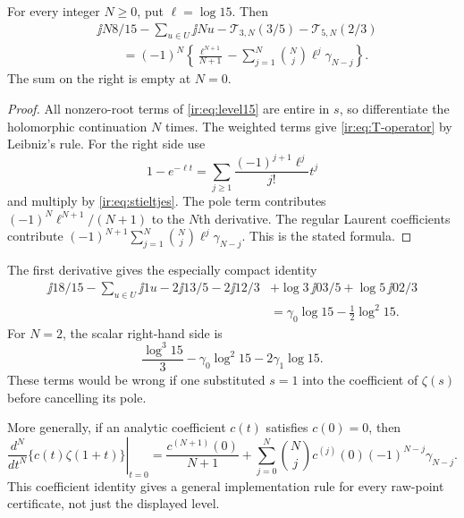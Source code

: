 \begin{theorem}
\label{ir:thm:jets15}
For every integer $N\ge0$, put $\ell=\log15$. Then
\begin{align}
 &\jj{N}{8/15}-\sum_{u\in U}\jj{N}{u}
 -\mathcal T_{3,N}(3/5)-\mathcal T_{5,N}(2/3)\nonumber\\
 &\qquad =(-1)^N\left\{\frac{\ell^{N+1}}{N+1}
 -\sum_{j=1}^{N}\binom Nj\ell^j\gamma_{N-j}\right\}.
 \label{ir:eq:jets15}
\end{align}
The sum on the right is empty at $N=0$.
\end{theorem}
\begin{proof}
All nonzero-root terms of \eqref{ir:eq:level15} are entire in $s$,
so differentiate the holomorphic continuation $N$ times. The weighted
terms give \eqref{ir:eq:T-operator} by Leibniz's rule. For the right
side use
\[
 1-e^{-\ell t}=\sum_{j\ge1}\frac{(-1)^{j+1}\ell^j}{j!}t^j
\]
and multiply by \eqref{ir:eq:stieltjes}. The pole term contributes
$(-1)^N\ell^{N+1}/(N+1)$ to the $N$th derivative. The regular
Laurent coefficients contribute
$(-1)^{N+1}\sum_{j=1}^N\binom Nj\ell^j\gamma_{N-j}$.
This is the stated formula.
\end{proof}

The first derivative gives the especially compact identity
\begin{align}
 \jj{1}{8/15}-\sum_{u\in U}\jj{1}{u}
 -2\jj{1}{3/5}-2\jj{1}{2/3}
 &+\log3\,\jj{0}{3/5}+\log5\,\jj{0}{2/3}\nonumber\\
 &=\gamma_0\log15-\tfrac12\log^2 15.
 \label{ir:eq:first-jet}
\end{align}
For $N=2$, the scalar right-hand side is
\[
 \frac{\log^3 15}{3}-\gamma_0\log^2 15-2\gamma_1\log15.
\]
These terms would be wrong if one substituted $s=1$ into the
coefficient of $\zeta(s)$ before cancelling its pole.

More generally, if an analytic coefficient $c(t)$ satisfies $c(0)=0$,
then
\begin{equation}\label{ir:eq:general-pole-jet}
 \left.\frac{d^N}{dt^N}\{c(t)\zeta(1+t)\}\right|_{t=0}
 =\frac{c^{(N+1)}(0)}{N+1}
 +\sum_{j=0}^{N}\binom Nj c^{(j)}(0)(-1)^{N-j}\gamma_{N-j}.
\end{equation}
This coefficient identity gives a general implementation rule for every
raw-point certificate, not just the displayed level.

